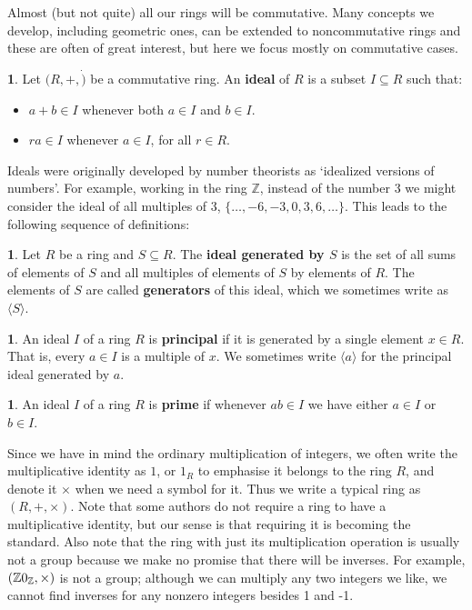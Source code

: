 \documentclass[oneside,english]{amsbook}
\numberwithin{section}{chapter}
\theoremstyle{plain}
\theoremstyle{definition}
\newtheorem{defn}[thm]{\protect\definitionname}
\providecommand{\definitionname}{Definition}
\begin{document}
Almost (but not quite) all our rings will be commutative. Many concepts we develop, including geometric ones, can be extended to noncommutative rings and these are often of great interest, but here we focus mostly on commutative cases.

\begin{defn}Let $(R, +, \dot)$ be a commutative ring. An \textbf{ideal} of $R$ is a subset $I\subseteq R$ such that:
	\begin{itemize}
		\item{$a + b\in I$ whenever both $a\in I$ and $b\in I$.}
		\item{$ra\in I$ whenever $a\in I$, for all $r\in R$.}
	\end{itemize}
\end{defn}

Ideals were originally developed by number theorists as `idealized versions of numbers'. For example, working in the ring $\mathbb{Z}$, instead of the number 3 we might consider the ideal of all multiples of 3, $\{\ldots, -6, -3, 0, 3, 6, \ldots\}$. This leads to the following sequence of definitions:

\begin{defn}
	Let $R$ be a ring and $S\subseteq R$. The \textbf{ideal generated by $S$} is the set of all sums of elements of $S$ and all multiples of elements of $S$ by elements of $R$. The elements of $S$ are called \textbf{generators} of this ideal, which we sometimes write as $\langle S\rangle$.
\end{defn}

\begin{defn}
	An ideal $I$ of a ring $R$ is \textbf{principal} if it is generated by a single element $x\in R$. That is, every $a\in I$ is a multiple of $x$. We sometimes write $\langle a\rangle$ for the principal ideal generated by $a$.
\end{defn}

\begin{defn}
	An ideal $I$ of a ring $R$ is \textbf{prime} if whenever $ab\in I$ we have either $a\in I$ or $b\in I$.
\end{defn}

Since we have in mind the ordinary multiplication of integers, we often write the multiplicative identity as $1$, or $1_R$ to emphasise it belongs to the ring $R$, and denote it $\times$ when we need a symbol for it. Thus we write a typical ring as $(R, +, \times)$. Note that some authors do not require a ring to have a multiplicative identity, but our sense is that requiring it is becoming the standard. Also note that the ring with just its multiplication operation is usually not a group because we make no promise that there will be inverses. For example, $(\mathbb{Z}\\0_{\mathbb{Z}}, \times)$ is not a group; although we can multiply any two integers we like, we cannot find inverses for any nonzero integers besides 1 and -1.
\end{document}
